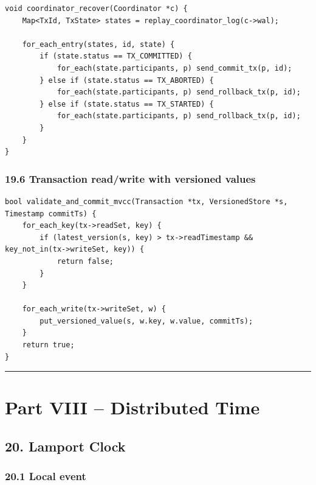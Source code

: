 \documentclass[10pt,letterpaper]{article}
\begin{document}
\begin{verbatim}
void coordinator_recover(Coordinator *c) {
    Map<TxId, TxState> states = replay_coordinator_log(c->wal);

    for_each_entry(states, id, state) {
        if (state.status == TX_COMMITTED) {
            for_each(state.participants, p) send_commit_tx(p, id);
        } else if (state.status == TX_ABORTED) {
            for_each(state.participants, p) send_rollback_tx(p, id);
        } else if (state.status == TX_STARTED) {
            for_each(state.participants, p) send_rollback_tx(p, id);
        }
    }
}
\end{verbatim}

\subsubsection*{19.6 Transaction read/write with versioned values}

\begin{verbatim}
bool validate_and_commit_mvcc(Transaction *tx, VersionedStore *s, Timestamp commitTs) {
    for_each_key(tx->readSet, key) {
        if (latest_version(s, key) > tx->readTimestamp && key_not_in(tx->writeSet, key)) {
            return false;
        }
    }

    for_each_write(tx->writeSet, w) {
        put_versioned_value(s, w.key, w.value, commitTs);
    }
    return true;
}
\end{verbatim}

\medskip\hrule\medskip

\clearpage
\section*{Part VIII -- Distributed Time}

\subsection*{20. Lamport Clock}

\subsubsection*{20.1 Local event}
\end{document}
